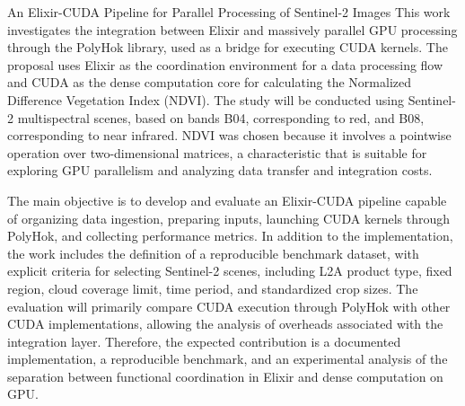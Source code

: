 \documentclass[tcc,capa]{texufpel}
\begin{document}
\begin{englishabstract}{An Elixir-CUDA Pipeline for Parallel Processing of Sentinel-2 Images}
This work investigates the integration between Elixir and massively parallel GPU processing through the PolyHok library, used as a bridge for executing CUDA kernels. The proposal uses Elixir as the coordination environment for a data processing flow and CUDA as the dense computation core for calculating the Normalized Difference Vegetation Index (NDVI). The study will be conducted using Sentinel-2 multispectral scenes, based on bands B04, corresponding to red, and B08, corresponding to near infrared. NDVI was chosen because it involves a pointwise operation over two-dimensional matrices, a characteristic that is suitable for exploring GPU parallelism and analyzing data transfer and integration costs.

The main objective is to develop and evaluate an Elixir-CUDA pipeline capable of organizing data ingestion, preparing inputs, launching CUDA kernels through PolyHok, and collecting performance metrics. In addition to the implementation, the work includes the definition of a reproducible benchmark dataset, with explicit criteria for selecting Sentinel-2 scenes, including L2A product type, fixed region, cloud coverage limit, time period, and standardized crop sizes. The evaluation will primarily compare CUDA execution through PolyHok with other CUDA implementations, allowing the analysis of overheads associated with the integration layer. Therefore, the expected contribution is a documented implementation, a reproducible benchmark, and an experimental analysis of the separation between functional coordination in Elixir and dense computation on GPU.
\end{englishabstract}

\listoffigures

\listoftables
\end{document}
